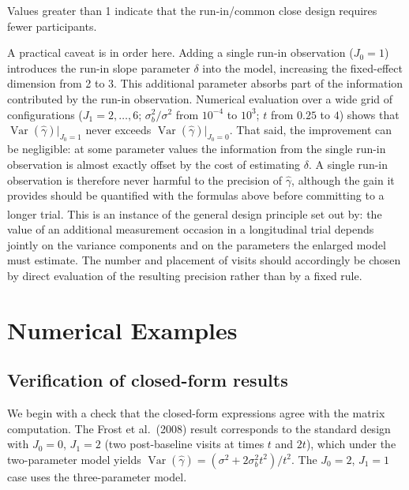 \documentclass[
  11pt,
]{article}
\begin{document}
Values greater than 1 indicate that the run-in/common close
design requires fewer participants.

A practical caveat is in order here. Adding a single run-in
observation (\(J_0=1\)) introduces the run-in slope parameter
\(\delta\) into the model, increasing the fixed-effect dimension
from 2 to 3. This additional parameter absorbs part of the
information contributed by the run-in observation. Numerical
evaluation over a wide grid of configurations (\(J_1 = 2,
\ldots, 6\); \(\sigma_b^2/\sigma^2\) from \(10^{-4}\) to \(10^{3}\);
\(t\) from \(0.25\) to \(4\)) shows that \(\mathop{\mathrm{Var}}(\hat\gamma)|_{J_0=1}\)
never exceeds \(\mathop{\mathrm{Var}}(\hat\gamma)|_{J_0=0}\). That said, the
improvement can be negligible: at some parameter values the
information from the single run-in observation is almost
exactly offset by the cost of estimating \(\delta\). A single
run-in observation is therefore never harmful to the precision
of \(\hat\gamma\), although the gain it provides should be
quantified with the formulas above before committing to a
longer trial. This is an instance of the general design
principle set out by\textsuperscript{}: the value of an
additional measurement occasion in a longitudinal trial
depends jointly on the variance components and on the
parameters the enlarged model must estimate. The number and
placement of visits should accordingly be chosen by direct
evaluation of the resulting precision rather than by a fixed
rule.

\section{Numerical Examples}\label{numerical-examples}

\subsection{Verification of closed-form results}\label{verification-of-closed-form-results}

We begin with a check that the closed-form expressions agree
with the matrix computation. The Frost et al.~(2008) result
corresponds to the standard design with \(J_0=0\), \(J_1=2\)
(two post-baseline visits at times \(t\) and \(2t\)), which under
the two-parameter model yields
\(\mathop{\mathrm{Var}}(\hat{\gamma}) = (\sigma^2 + 2\sigma_b^2 t^2)/t^2\).
The \(J_0=2\), \(J_1=1\) case uses the three-parameter model.
\end{document}
